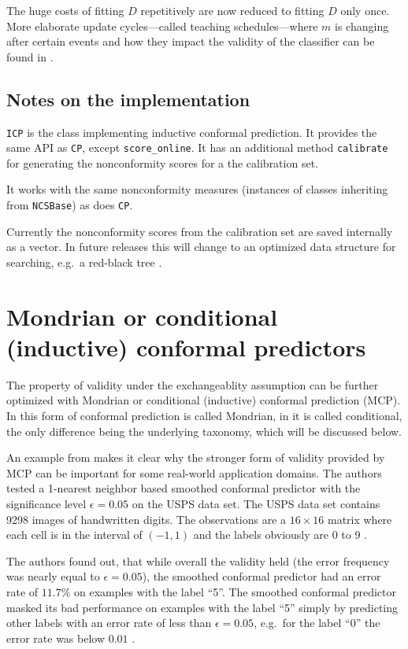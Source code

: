 \documentclass[twoside,11pt]{article}
\begin{document}
The huge costs of fitting $D$ repetitively are now reduced
to fitting $D$ only once.
More elaborate update cycles---called teaching
schedules---where $m$ is changing after certain events
and how they impact the validity of the classifier can be
found in \citet[Chapters 4.3, 4.4]{alrw}.

\subsection*{Notes on the implementation}

\texttt{ICP} is the class implementing inductive conformal
prediction. It provides the same API as \texttt{CP},
except \texttt{score\_online}. It has an additional method
\texttt{calibrate} for generating the nonconformity scores
for a the calibration set.

It works with the same nonconformity measures (instances
of classes inheriting from \texttt{NCSBase}) as does
\texttt{CP}.

Currently the nonconformity scores from the calibration set
are saved internally as a vector. In future releases this
will change to an optimized data structure for searching,
e.g.\ a red-black tree \citep[see][]{cormen}.

\section{Mondrian or conditional (inductive) conformal
         predictors}
\label{sec:mcp}

The property of validity under the exchangeablity
assumption can be further optimized with Mondrian or
conditional (inductive) conformal prediction (MCP).
In \citet[Chapter 4.5]{alrw} this form of conformal
prediction is called Mondrian, in \citet[Chapter 2]{cprml}
it is called conditional, the only difference being the
underlying taxonomy, which will be discussed below.

An example from \citet[Chapter 4.5]{alrw} makes it clear
why the stronger form of validity provided by MCP can be
important for some real-world application domains.
The authors tested a 1-nearest neighbor based smoothed
conformal predictor with the significance level
$\epsilon=0.05$ on the USPS data set.
The USPS data set contains 9298 images of handwritten
digits.
The observations are a $16 \times 16$ matrix where each
cell is in the interval of $(-1,1)$ and the labels
obviously are 0 to 9 \citep[see][]{lecun_et_al_1989}.

The authors found out, that while overall the validity held
(the error frequency was nearly equal to $\epsilon=0.05$),
the smoothed conformal predictor had an error rate of
$11.7\%$ on examples with the label ``5''.
The smoothed conformal predictor masked its bad performance
on examples with the label ``5'' simply by predicting other
labels with an error rate of less than $\epsilon = 0.05$,
e.g.\ for the label ``0'' the error rate was below $0.01$
\citep[see][Chapter 4.5]{alrw}.
\end{document}
